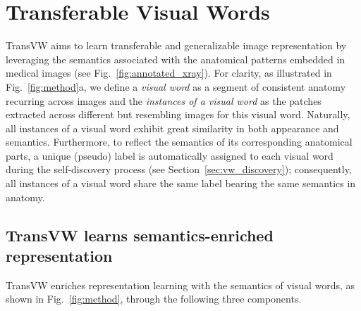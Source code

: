 \documentclass[journal,twoside,web]{ieeecolor}
\def\figurename{Fig.}
\begin{document}
\section{Transferable Visual Words}
\label{sec:method}
TransVW aims to learn transferable and generalizable image representation by leveraging the semantics associated with the anatomical patterns embedded in medical images (see \figurename~\ref{fig:annotated_xray}). For clarity, as illustrated in \figurename~\ref{fig:method}a, we define a \textit{visual word} as a segment of consistent anatomy recurring across images and the \textit{instances of a visual word} as the patches extracted across different but resembling images for this visual word. Naturally, all instances of a visual word exhibit great similarity in both appearance and semantics. Furthermore, to reflect the semantics of its corresponding anatomical parts, a unique (pseudo) label is automatically assigned to each visual word during the self-discovery process (see Section~\ref{sec:vw_discovery}); consequently, all instances of a visual word share the same label bearing the same semantics in anatomy.



\subsection{TransVW learns semantics-enriched representation}
\label{sec:method_semantics-enriched}

TransVW enriches representation learning with the semantics of visual words, as shown in \figurename~\ref{fig:method}, through the following three components.
\end{document}
